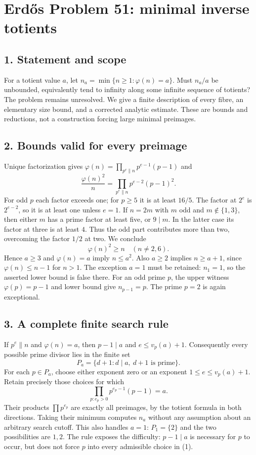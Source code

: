 \section*{Erd\H{o}s Problem 51: minimal inverse totients}
\subsection*{1. Statement and scope}
For a totient value $a$, let $n_a=\min\{n\ge1:\varphi(n)=a\}$. Must $n_a/a$ be unbounded, equivalently tend to infinity along some infinite sequence of totients? The problem remains unresolved. We give a finite description of every fibre, an elementary size bound, and a corrected analytic estimate. These are bounds and reductions, not a construction forcing large minimal preimages.

\subsection*{2. Bounds valid for every preimage}
Unique factorization gives $\varphi(n)=\prod_{p^e\parallel n}p^{e-1}(p-1)$ and
\[
 \frac{\varphi(n)^2}{n}=\prod_{p^e\parallel n}p^{e-2}(p-1)^2.
\]
For odd $p$ each factor exceeds one; for $p\ge5$ it is at least $16/5$. The factor at $2^e$ is $2^{e-2}$, so it is at least one unless $e=1$. If $n=2m$ with $m$ odd and $m\notin\{1,3\}$, then either $m$ has a prime factor at least five, or $9\mid m$. In the latter case its factor at three is at least $4$. Thus the odd part contributes more than two, overcoming the factor $1/2$ at two. We conclude
\[
 \varphi(n)^2\ge n\quad(n\ne2,6).
\]
Hence $a\ge3$ and $\varphi(n)=a$ imply $n\le a^2$. Also $a\ge2$ implies $n\ge a+1$, since $\varphi(n)\le n-1$ for $n>1$. The exception $a=1$ must be retained: $n_1=1$, so the asserted lower bound is false there. For an odd prime $p$, the upper witness $\varphi(p)=p-1$ and lower bound give $n_{p-1}=p$. The prime $p=2$ is again exceptional.

\subsection*{3. A complete finite search rule}
If $p^e\parallel n$ and $\varphi(n)=a$, then $p-1\mid a$ and $e\le v_p(a)+1$. Consequently every possible prime divisor lies in the finite set
\[
 P_a=\{d+1:d\mid a,\ d+1\text{ is prime}\}.
\]
For each $p\in P_a$, choose either exponent zero or an exponent $1\le e\le v_p(a)+1$. Retain precisely those choices for which
\[
 \prod_{p:e_p>0}p^{e_p-1}(p-1)=a. \tag{1}
\]
Their products $\prod p^{e_p}$ are exactly all preimages, by the totient formula in both directions. Taking their minimum computes $n_a$ without any assumption about an arbitrary search cutoff. This also handles $a=1$: $P_1=\{2\}$ and the two possibilities are $1,2$.
The rule exposes the difficulty: $p-1\mid a$ is necessary for $p$ to occur, but does not force $p$ into every admissible choice in (1).

